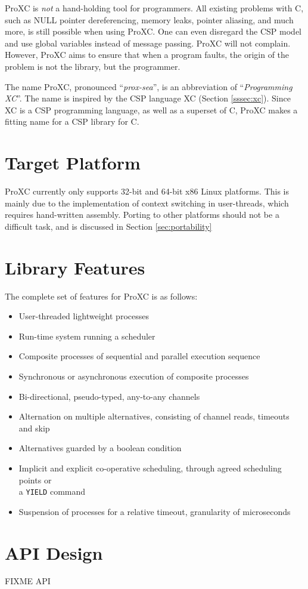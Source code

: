 ProXC is \textit{not} a hand\hyp{}holding tool for programmers. All existing problems with C, such as NULL pointer dereferencing, memory leaks, pointer aliasing, and much more, is still possible when using ProXC. One can even disregard the CSP model and use global variables instead of message passing. ProXC will not complain. However, ProXC aims to ensure that when a program faults, the origin of the problem is not the library, but the programmer. 

The name ProXC, pronounced ``\textit{prox\hyp{}sea}'', is an abbreviation of ``\textit{Programming XC}''. The name is inspired by the CSP language XC (Section \ref{sssec:xc}). Since XC is a CSP programming language, as well as a superset of C, ProXC makes a fitting name for a CSP library for C. 

\section{Target Platform}
\label{sec:proxc_target_platform}

ProXC currently only supports 32\hyp{}bit and 64\hyp{}bit x86 Linux platforms. This is mainly due to the implementation of context switching in user\hyp{}threads, which requires hand\hyp{}written assembly. Porting to other platforms should not be a difficult task, and is discussed in Section \ref{sec:portability}

\section{Library Features}
\label{sec:proxc_features}

The complete set of features for ProXC is as follows:
\begin{itemize}
    \setlength\itemsep{0em}
    \item User\hyp{}threaded lightweight processes
    \item Run\hyp{}time system running a scheduler
    \item Composite processes of sequential and parallel execution sequence
    \item Synchronous or asynchronous execution of composite processes
    \item Bi\hyp{}directional, pseudo\hyp{}typed, any\hyp{}to\hyp{}any channels
    \item Alternation on multiple alternatives, consisting of channel reads, timeouts and skip
    \item Alternatives guarded by a boolean condition
    \item Implicit and explicit co\hyp{}operative scheduling, through agreed scheduling points or\\ a \texttt{YIELD} command
    \item Suspension of processes for a relative timeout, granularity of microseconds
\end{itemize}

\section{API Design}

FIXME API


